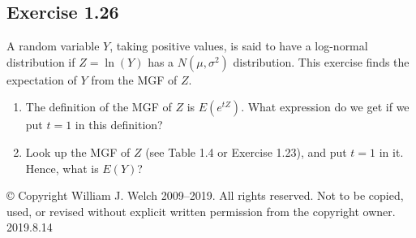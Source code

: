 \documentclass{book}
\begin{document}
\subsection{Exercise 1.26}
A random variable $Y$, taking positive values, is said to have a log-normal distribution if $Z = \ln(Y)$ has a $N(\mu, \sigma^2)$ distribution. This exercise finds the expectation of $Y$ from the MGF of $Z$.
\begin{enumerate}
    \item The definition of the MGF of $Z$ is $E(e^{tZ})$. What expression do we get if we put $t = 1$ in this definition? 
    \item Look up the MGF of $Z$ (see Table 1.4 or Exercise 1.23), and put $t = 1$ in it. Hence, what is $E(Y)$?
\end{enumerate}

© Copyright William J. Welch 2009--2019. All rights reserved. Not to be copied, used, or revised without explicit written permission from the copyright owner. 2019.8.14

\end{document}
